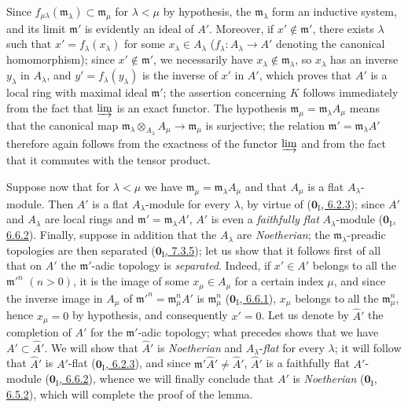 Since $f_{\mu\lambda}(\mathfrak m_\lambda)\subset\mathfrak m_\mu$ for
$\lambda<\mu$ by hypothesis, the $\mathfrak m_\lambda$ form an inductive
system, and its limit $\mathfrak m'$ is evidently an ideal of $A'$.
Moreover, if $x'\notin\mathfrak m'$, there exists $\lambda$ such that
$x'=f_\lambda(x_\lambda)$ for some $x_\lambda\in A_\lambda$
($f_\lambda:A_\lambda\to A'$ denoting the canonical homomorphism); since
$x'\notin\mathfrak m'$, we necessarily have
$x_\lambda\notin\mathfrak m_\lambda$, so $x_\lambda$ has an inverse
$y_\lambda$ in $A_\lambda$, and $y'=f_\lambda(y_\lambda)$ is the inverse of
$x'$ in $A'$, which proves that $A'$ is a local ring with maximal ideal
$\mathfrak m'$; the assertion concerning $K$ follows immediately from the fact
that $\varinjlim$ is an exact functor. The hypothesis
$\mathfrak m_\mu=\mathfrak m_\lambda A_\mu$ means that the canonical
map
$\mathfrak m_\lambda\otimes_{A_\lambda}A_\mu\to\mathfrak m_\mu$ is
surjective; the relation $\mathfrak m'=\mathfrak m_\lambda A'$ therefore again
follows from the exactness of the functor $\varinjlim$ and from the fact that it
commutes with the tensor product.

Suppose now that for $\lambda<\mu$ we have
$\mathfrak m_\mu=\mathfrak m_\lambda A_\mu$ and that $A_\mu$ is a flat
$A_\lambda$-module. Then $A'$ is a flat $A_\lambda$-module for every
$\lambda$, by virtue of (\hyperref[0.6.2.3]{$\mathbf{0}_{\mathrm I}$, 6.2.3});
since $A'$ and $A_\lambda$ are local rings and
$\mathfrak m'=\mathfrak m_\lambda A'$, $A'$ is even a
\emph{faithfully flat} $A_\lambda$-module
(\hyperref[0.6.6.2]{$\mathbf{0}_{\mathrm I}$, 6.6.2}). Finally, suppose in addition
that the $A_\lambda$ are \emph{Noetherian}; the
$\mathfrak m_\lambda$-preadic topologies are then separated
(\hyperref[0.7.3.5]{$\mathbf{0}_{\mathrm I}$, 7.3.5}); let us show that it follows
first of all that on $A'$ the $\mathfrak m'$-adic topology is \emph{separated}.
Indeed, if $x'\in A'$ belongs to all the $\mathfrak m'^{n}$ $(n>0)$,
it is the image of some $x_\mu\in A_\mu$ for a certain index $\mu$, and since
the inverse image in $A_\mu$ of
$\mathfrak m'^{n}=\mathfrak m_\mu^n A'$ is $\mathfrak m_\mu^n$
(\hyperref[0.6.6.1]{$\mathbf{0}_{\mathrm I}$, 6.6.1}), $x_\mu$ belongs to all
the $\mathfrak m_\mu^n$, hence $x_\mu=0$ by hypothesis, and consequently
$x'=0$. Let us denote by $\widehat A'$ the completion of $A'$ for the
$\mathfrak m'$-adic topology; what precedes shows that we have
$A'\subset\widehat A'$. We will show that $\widehat A'$ is
\emph{Noetherian} and $A_\lambda$-\emph{flat} for every $\lambda$; it will
follow that $\widehat A'$ is $A'$-flat
(\hyperref[0.6.2.3]{$\mathbf{0}_{\mathrm I}$, 6.2.3}), and since
$\mathfrak m'\widehat A'\ne\widehat A'$, $\widehat A'$ is a faithfully
flat $A'$-module (\hyperref[0.6.6.2]{$\mathbf{0}_{\mathrm I}$, 6.6.2}), whence we
will finally conclude that $A'$ is \emph{Noetherian}
(\hyperref[0.6.5.2]{$\mathbf{0}_{\mathrm I}$, 6.5.2}), which will complete the
proof of the lemma.

